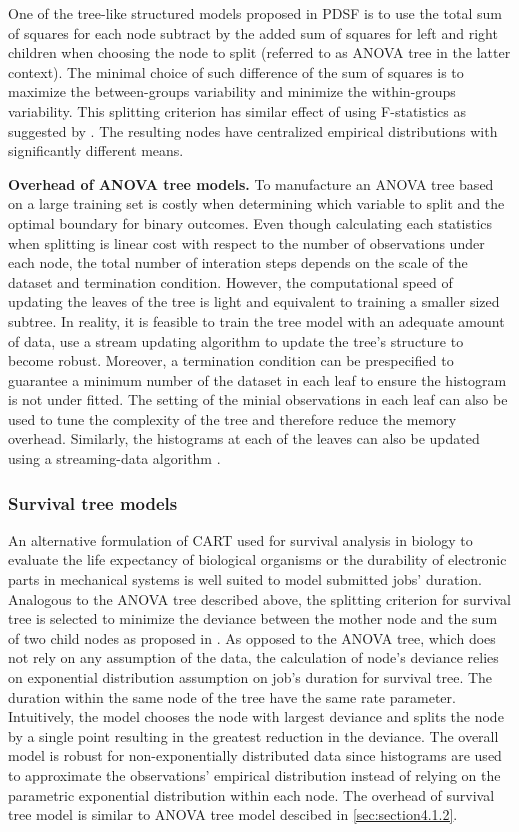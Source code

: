 \documentclass[sigplan,10pt,review,anonymous]{acmart}
\begin{document}
One of the tree-like structured models proposed in PDSF is to use the
total sum of squares for each node subtract by the added sum of squares for left
and right children when choosing the node to split (referred to as ANOVA tree in
the latter context). The minimal choice of such difference of the sum of squares
is to maximize the between-groups variability and minimize the within-groups
variability. This splitting criterion has similar effect of using F-statistics
as suggested by \cite{10.2307/24306157}. The resulting nodes have centralized
empirical distributions with significantly different means.

\textbf{Overhead of ANOVA tree models.} To manufacture an ANOVA tree based on a
large training set is costly when determining which variable to split and the
optimal boundary for binary outcomes. Even though calculating each statistics
when splitting is linear cost with respect to the number of observations under
each node, the total number of interation steps depends on the scale of the
dataset and termination condition. However, the computational speed of updating
the leaves of the tree is light and equivalent to training a smaller sized
subtree. In reality, it is feasible to train the tree model with an adequate
amount of data, use a stream updating algorithm \cite{756006.1756034} to update
the tree's structure to become robust. Moreover, a termination condition can be
prespecified to guarantee a minimum number of the dataset in each leaf to ensure
the histogram is not under fitted. The setting of the minial observations in
each leaf can also be used to tune the complexity of the tree and therefore
reduce the memory overhead. Similarly, the histograms at each of the leaves can
also be updated using a streaming-data algorithm \cite{756006.1756034}. 

\subsubsection{Survival tree models}
\label{sec:section4.1.3}

An alternative formulation of CART used for survival analysis in biology to
evaluate the life expectancy of biological organisms or the durability of
electronic parts in mechanical systems is well suited to model submitted jobs'
duration. Analogous to the ANOVA tree described above, the splitting criterion
for survival tree is selected to minimize the deviance between the mother node
and the sum of two child nodes as proposed in \cite{LeBlanc}. As opposed to the
ANOVA tree, which does not rely on any assumption of the data, the calculation of node's deviance relies on exponential distribution assumption on job's duration for survival tree. The duration within the same node of the tree have the same rate parameter. Intuitively, the model chooses the node with largest
deviance and splits the node by a single
point resulting in the greatest reduction in the deviance. The overall model is robust for non-exponentially
distributed data since histograms are used to approximate the observations'
empirical distribution instead of relying on the parametric exponential
distribution within each node. The overhead of survival tree model is similar to ANOVA tree
model descibed in \cref{sec:section4.1.2}.
\end{document}
